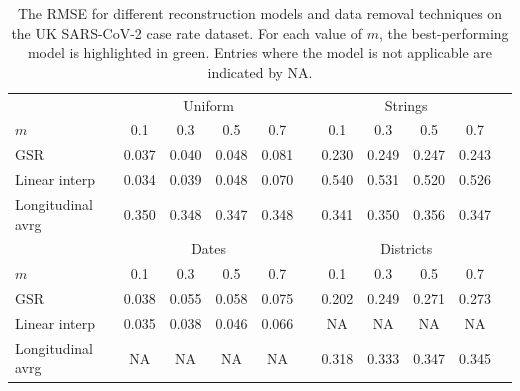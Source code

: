  
\begin{table}[t]
    \centering
    \footnotesize 
    \def\arraystretch{1.4}
    \begin{tabular}{lcccccccccc}
    \toprule
    & \multicolumn{4}{c}{Uniform} & \phantom{a} & \multicolumn{4}{c}{Strings} \\
    \cmidrule{2-5} \cmidrule{7-10} 
    $m$ & 0.1   & 0.3 & 0.5 & 0.7 &&  0.1   & 0.3  & 0.5 & 0.7  \\ \midrule \rule{0pt}{0.5cm}
    GSR & 0.037 & 0.040 & \colorbox{best!35}{0.048} & 0.081 && \colorbox{best!35}{0.230} &  \colorbox{best!35}{0.249} & \colorbox{best!35}{0.247} & \colorbox{best!35}{0.243} \\ \rule{0pt}{6ex} 
    Linear interp & \colorbox{best!35}{0.034} & \colorbox{best!35}{0.039} &  \colorbox{best!35}{0.048} & \colorbox{best!35}{0.070} && 0.540 & 0.531 & 0.520 & 0.526 \\ \rule{0pt}{6ex}
    Longitudinal avrg & 0.350 & 0.348 &  0.347 & 0.348 && 0.341 & 0.350 & 0.356 & 0.347  \\[0.2cm] \midrule \rule{0pt}{4ex}
    & \multicolumn{4}{c}{Dates} & \phantom{a} & \multicolumn{4}{c}{Districts} \\
    \cmidrule{2-5} \cmidrule{7-10} 
    $m$ & 0.1   & 0.3 & 0.5 & 0.7 &&  0.1   & 0.3  & 0.5 & 0.7  \\ \midrule \rule{0pt}{0.5cm}
    GSR & 0.038 & 0.055 & 0.058 & 0.075  && \colorbox{best!35}{0.202} & \colorbox{best!35}{0.249} & \colorbox{best!35}{0.271} & \colorbox{best!35}{0.273} \\ \rule{0pt}{6ex} 
    Linear interp & \colorbox{best!35}{0.035} & \colorbox{best!35}{0.038} & \colorbox{best!35}{0.046} & \colorbox{best!35}{0.066} && NA & NA & NA & NA \\ \rule{0pt}{6ex}
    Longitudinal avrg & NA & NA & NA & NA && 0.318 & 0.333 & 0.347 & 0.345 \\[0.2cm] \bottomrule
    \end{tabular}
    \caption[Graph signal reconstruction real data results]{The RMSE for different reconstruction models and data removal techniques on the UK SARS-CoV-2 case rate dataset. For each value of $m$, the best-performing model is highlighted in green. Entries where the model is not applicable are indicated by NA. }
    \label{tab:gsr_real_data_experiemnts} 
\end{table}

\newpage

